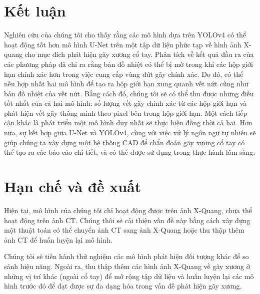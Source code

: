 \documentclass[../the.tex]{subfiles}
\begin{document}
\section{Kết luận}

{\fontsize{13}{12} \selectfont
Nghiên cứu của chúng tôi cho thấy rằng các mô hình dựa trên YOLOv4 có thể hoạt động tốt hơn mô hình U-Net trên một tập dữ liệu phức tạp về hình ảnh X-quang cho mục đích phát hiện gãy xương cổ tay. Phân tích về kết quả đầu ra của các phương pháp đã chỉ ra rằng bản đồ nhiệt có thể bị mờ trong khi các hộp giới hạn chính xác hơn trong việc cung cấp vùng đứt gãy chính xác. Do đó, có thể nếu hợp nhất hai mô hình để tạo ra hộp giới hạn xung quanh vết nứt cũng như bản đồ nhiệt của vết nứt. Bằng cách đó, chúng tôi sẽ có thể thu được những điều tốt nhất của cả hai mô hình: số lượng vết gãy chính xác từ các hộp giới hạn và phát hiện vết gãy thông minh theo pixel bên trong hộp giới hạn. Một cách tiếp cận khác là phát triển một mô hình duy nhất sẽ thực hiện đồng thời cả hai. Hơn nữa, sự kết hợp giữa U-Net và YOLOv4, cùng với việc xử lý ngôn ngữ tự nhiên sẽ giúp chúng ta xây dựng một hệ thống CAD để chẩn đoán gãy xương cổ tay có thể tạo ra các báo cáo chi tiết, và có thể được sử dụng trong thực hành lâm sàng.
}
\bigskip

\section{Hạn chế và đề xuất}

{\fontsize{13}{12} \selectfont
Hiện tại, mô hình của chúng tôi chỉ hoạt động được trên ảnh X-Quang, chưa thể hoạt động trên ảnh CT. Chúng thôi sẽ cải thiện vấn đề này bằng cách xây dựng một thuật toán có thể chuyển ảnh CT sang ảnh X-Quang hoặc thu thập thêm ảnh CT để huấn luyện lại mô hình. 

Chúng tôi sẽ tiến hành thử nghiệm các mô hình phát hiện đối tượng khác để so sánh hiệu năng. Ngoài ra, thu thập thêm các hình ảnh X-Quang về gãy xương ở những vị trí khác (ngoài cổ tay) để mở rộng tập dữ liệu và huấn luyện lại các mô hình trước đó để đạt được sự đa dạng hóa trong vấn đề phát hiện gãy xương.
}
\end{document}
